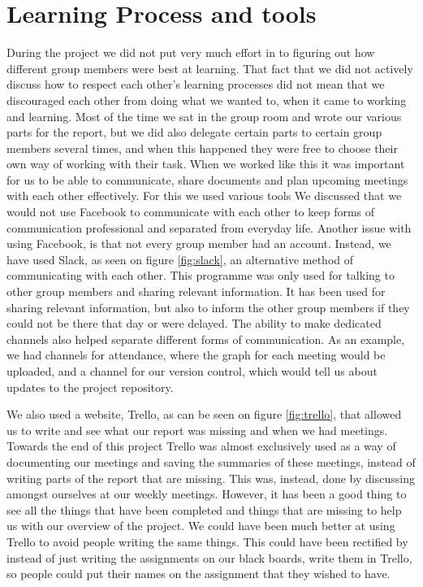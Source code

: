 \begin{figure}
	\centering
	
\end{figure}

\section{Learning Process and tools}
During the project we did not put very much effort in to figuring out how different group members were best at learning.
That fact that we did not actively discuss how to respect each other's learning processes did not mean that we discouraged each other from doing what we wanted to, when it came to working and learning.
Most of the time we sat in the group room and wrote our various parts for the report, but we did also delegate certain parts to certain group members several times, and when this happened they were free to choose their own way of working with their task.
When we worked like this it was important for us to be able to communicate, share documents and plan upcoming meetings with each other effectively.
For this we used various tools
We discussed that we would not use Facebook to communicate with each other to keep forms of communication professional and separated from everyday life.
Another issue with using Facebook, is that not every group member had an account.
Instead, we have used Slack, as seen on figure \ref{fig:slack}, an alternative method of communicating with each other. 
This programme was only used for talking to other group members and sharing relevant information. 
It has been used for sharing relevant information, but also to inform the other group members if they could not be there that day or were delayed. 
The ability to make dedicated channels also helped separate different forms of communication. As an example, we had channels for attendance, where the graph for each meeting would be uploaded, and a channel for our version control, which would tell us about updates to the project repository.

We also used a website, Trello, as can be seen on figure \ref{fig:trello}, that allowed us to write and see what our report was missing and when we had meetings. 
Towards the end of this project Trello was almost exclusively used as a way of documenting our meetings and saving the summaries of these meetings, instead of writing parts of the report that are missing. 
This was, instead, done by discussing amongst ourselves at our weekly meetings.
However, it has been a good thing to see all the things that have been completed and things that are missing to help us with our overview of the project.
We could have been much better at using Trello to avoid people writing the same things.
This could have been rectified by instead of just writing the assignments on our black boards, write them in Trello, so people could put their names on the assignment that they wished to have.


